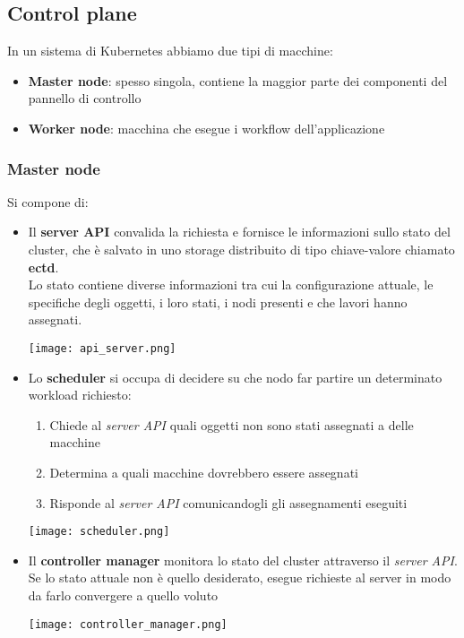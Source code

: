 \subsection{Control plane}
In un sistema di Kubernetes abbiamo due tipi di macchine:
\begin{itemize}
	\item \textbf{Master node}: spesso singola, contiene la maggior parte dei componenti del pannello di controllo
	\item \textbf{Worker node}: macchina che esegue i workflow dell'applicazione
\end{itemize}

\subsubsection{Master node}
Si compone di:
\begin{itemize}
	\item Il \textbf{server API} convalida la richiesta e fornisce le informazioni sullo stato del cluster, che è salvato in uno storage distribuito di tipo chiave-valore chiamato \textbf{ectd}.\\
	Lo stato contiene diverse informazioni tra cui la configurazione attuale, le specifiche degli oggetti, i loro stati, i nodi presenti e che lavori hanno assegnati.
	\begin{center}
		\texttt{[image: api\_server.png]}
	\end{center}
	\item Lo \textbf{scheduler} si occupa di decidere su che nodo far partire un determinato workload richiesto:
	\begin{enumerate}
		\item Chiede al \textit{server API} quali oggetti non sono stati assegnati a delle macchine
		\item Determina a quali macchine dovrebbero essere assegnati
		\item Risponde al \textit{server API} comunicandogli gli assegnamenti eseguiti
	\end{enumerate}
	\begin{center}
		\texttt{[image: scheduler.png]}
	\end{center}
	\item Il \textbf{controller manager} monitora lo stato del cluster attraverso il \textit{server API}. Se lo stato attuale non è quello desiderato, esegue richieste al server in modo da farlo convergere a quello voluto
	\begin{center}
		\texttt{[image: controller\_manager.png]}
	\end{center}
\end{itemize}
